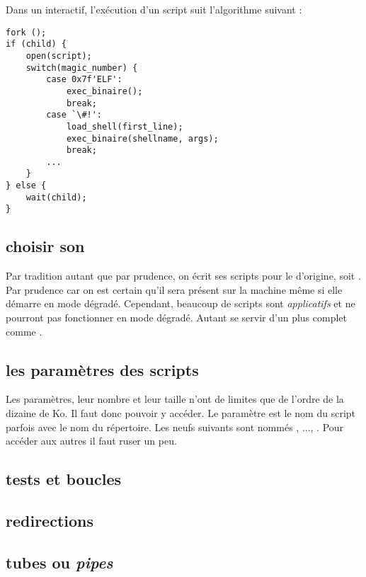 Dans un \shell interactif, l'exécution d'un script suit l'algorithme suivant :

\begin{lstlisting}
fork ();
if (child) {
	open(script);
	switch(magic_number) {
		case 0x7f'ELF':
			exec_binaire();
			break;
		case `\#!':
			load_shell(first_line);
			exec_binaire(shellname, args);
			break;
		...
	}
} else {
	wait(child);
}		
\end{lstlisting}

\subsection{choisir son \shell}
Par tradition autant que par prudence, on écrit ses scripts \shell pour le \shell d'origine, soit \sh. Par prudence car on est certain qu'il sera présent sur la machine même si elle démarre en mode dégradé. Cependant, beaucoup de scripts sont \emph{applicatifs} et ne pourront pas fonctionner en mode dégradé. Autant se servir d'un \shell plus complet comme \bash. 

\subsection{les paramètres des scripts}
Les paramètres, leur nombre et leur taille n'ont de limites que de l'ordre de la dizaine de Ko. Il faut donc pouvoir y accéder. Le paramètre  est le nom du script parfois avec le nom du répertoire. Les neufs suivants sont nommés , ..., . Pour accéder aux autres il faut ruser un peu.

\subsection{tests et boucles}

\subsection{redirections}

\subsection{tubes ou \emph{pipes}}
